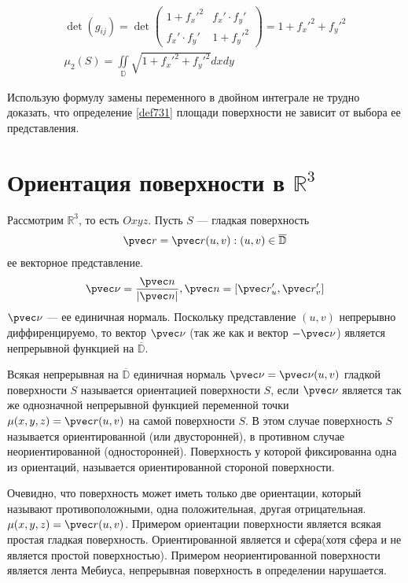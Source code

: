 \begin{gather*}
  \det (g_{ij}) = \det
  \begin{pmatrix}
    1 + f_x'^2 & f_x' \cdot f_y' \\
    f_x' \cdot f_y' & 1 + f_y'^2
  \end{pmatrix} =
  1 + f_x'^2 + f_y'^2 \\
  \mu_2(S) = \iint\limits_{\mathbb{D}} \sqrt{1 + f_x'^2 + f_y'^2} dx dy
\end{gather*}

\begin{remark}
  Использую формулу замены переменного в двойном интеграле не трудно доказать,
  что определение \eqref{def731} площади поверхности не зависит от выбора ее
  представления.
\end{remark}

\section{Ориентация поверхности в $\mathbb{R}^3$}
Рассмотрим $\mathbb{R}^3$, то есть $Oxyz$. Пусть $S$ --- гладкая поверхность
\begin{gather}
  \pvec r = \pvec r(u, v): (u, v) \in \overline{\mathbb{D}}
  \label{ch74:eq1}
\end{gather}
ее векторное представление.
\begin{gather}
  \pvec \nu = \frac{\pvec n}{|\pvec n|}, \pvec n = [\pvec r_u', \pvec r_v']
  \label{ch74:eq2}
\end{gather}
$\pvec \nu$ --- ее единичная нормаль. Поскольку представление $(u, v)$
непрерывно диффиренцируемо, то вектор $\pvec \nu$ (так же как и вектор $-\pvec
\nu$) является непрерывной функцией на $\overline{\mathbb{D}}$.

\begin{definition}
  Всякая непрерывная на $\overline{\mathbb{D}}$ единичная нормаль $\pvec \nu =
  \pvec \nu(u, v)$ гладкой поверхности $S$ называется ориентацией поверхности
  $S$, если $\pvec \nu$ является так же однозначной непрерывной функцией
  переменной точки $\mu(x, y, z) = \pvec r(u, v)$ на самой поверхности $S$. В
  этом случае поверхность $S$ называется ориентированной (или двусторонней), в
  противном случае неориентированной (односторонней). Поверхность у которой
  фиксированна одна из ориентаций, называется ориентированной стороной
  поверхности.
\end{definition}
Очевидно, что поверхность может иметь только две ориентации, который называют
противоположными, одна положительная, другая отрицательная. $\mu(x, y, z) =
\pvec r(u, v)$. Примером ориентации поверхности является всякая простая гладкая
поверхность. Ориентированной является и сфера(хотя сфера и не является простой
поверхностью). Примером неориентированной поверхности является лента Мебиуса,
непрерывная поверхность в определении нарушается. \\

